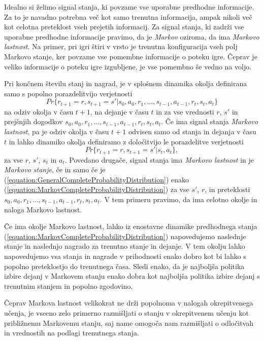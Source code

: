\documentclass[a4paper, oneside, 12pt]{report}
\begin{document}
Idealno si želimo signal stanja, ki povzame vse uporabne predhodne informacije. Za to je navadno potrebna več kot samo trenutna informacija, ampak nikoli več kot celotna preteklost vseh prejetih informacij. Za signal stanja, ki zadrži vse uporabne predhodne informacije pravimo, da je {\em Markov} oziroma, da ima {\em Markovo lastnost}. Na primer, pri igri štiri v vrsto je trenutna konfiguracija vseh polj Markovo stanje, ker povzame vse pomembne informacije o poteku igre. Čeprav je veliko informacije o poteku igre izgubljene, je vse pomembno še vedno na voljo.

Pri končnem številu stanj in nagrad, je v splošnem dinamika okolja definirana samo s popolno porazdelitvijo verjetnosti
\begin{equation} \label{equation:GeneralCompleteProbabilityDistribution}
Pr\{r_{t+1} = r, s_{t+1} = s' | s_0, a_0, r_1, \dots, s_{t-1}, a_{t-1}, r_t, s_t, a_t\}
\end{equation}
na odziv okolja v času $t+1$, na dejanje v času $t$ in za vse vrednosti $r$, $s'$ in prejšnjih dogodkov $s_0, a_0, r_1, \dots, s_{t-1}, a_{t-1}, r_t, s_t, a_t$. Če ima signal stanja {\em Markovo lastnost}, pa je odziv okolja v času $t+1$ odvisen samo od stanja in dejanja v času $t$ in lahko dinamiko okolja definiramo z določitvijo le porazdelitve verjetnosti
\begin{equation} \label{equation:MarkovCompleteProbabilityDistribution}
Pr\{r_{t+1} = r, s_{t+1} = s' | s_t, a_t\},
\end{equation}
za vse $r$, $s'$, $s_t$ in $a_t$. Povedano drugače, signal stanja ima {\em Markovo lastnost} in je {\em Markovo stanje}, če in samo če je (\ref{equation:GeneralCompleteProbabilityDistribution}) enako (\ref{equation:MarkovCompleteProbabilityDistribution}) za vse $s'$, $r$, in preteklosti $s_0, a_0, r_1, \dots, s_{t-1}, a_{t-1}, r_t, s_t, a_t$. V tem primeru pravimo, da ima celotno okolje in naloga Markovo lastnost.

Če ima okolje Markovo lastnost, lahko iz enostavne dinamike predhodnega stanja (\ref{equation:MarkovCompleteProbabilityDistribution}) napovedujemo naslednje stanje in naslednjo nagrado za trenutno stanje in dejanje. V tem okolju lahko napovedujemo vsa stanja in nagrade v prihodnosti enako dobro kot bi lahko s popolno preteklostjo do trenutnega časa. Sledi enako, da je najboljša politika izbire dejanj v Markovem stanju enako dobra kot najboljša politika izbire dejanj s trenutnim stanjem in popolno zgodovino.

Čeprav Markova lastnost velikokrat ne drži popolnoma v nalogah okrepitvenega učenja, je vseeno zelo primerno razmišljati o stanju v okrepitvenem učenju kot približnemu Markovemu stanju, saj name omogoča nam razmišljati o odločitvah in vrednostih na podlagi trenutnega stanja.
\end{document}
